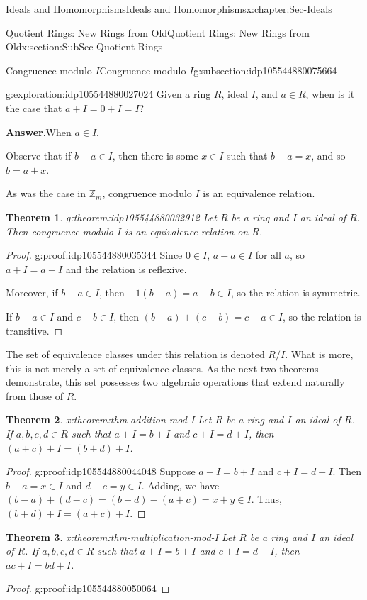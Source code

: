 \documentclass[oneside,10pt,]{book}
\newcommand{\blocktitlefont}{\relax}
\numberwithin{equation}{section}
\def\Z{{\mathbb Z}}
\newtheorem{theorem}{Theorem}[section]
\begin{document}
\begin{chapterptx}{Ideals and Homomorphisms}{}{Ideals and Homomorphisms}{}{}{x:chapter:Sec-Ideals}
\begin{sectionptx}{Quotient Rings: New Rings from Old}{}{Quotient Rings: New Rings from Old}{}{}{x:section:SubSec-Quotient-Rings}
\begin{subsectionptx}{Congruence modulo \(I\)}{}{Congruence modulo \(I\)}{}{}{g:subsection:idp105544880075664}
\begin{exploration}{}{g:exploration:idp105544880027024}%
Given a ring \(R\), ideal \(I\), and \(a\in R\), when is it the case that \(a + I = 0 + I = I\)?%
\par\smallskip%
\noindent\textbf{\blocktitlefont Answer}.\hypertarget{g:answer:idp105544880029328}{}\quad{}When \(a\in I\).%
\end{exploration}%
Observe that if \(b-a \in I\), then there is some \(x\in I\) such that \(b-a = x\), and so \(b = a+x\).%
\par
As was the case in \(\Z_m\), congruence modulo \(I\) is an equivalence relation.%
\begin{theorem}{}{}{g:theorem:idp105544880032912}%
Let \(R\) be a ring and \(I\) an ideal of \(R\). Then congruence modulo \(I\) is an equivalence relation on \(R\).%
\end{theorem}
\begin{proof}{}{g:proof:idp105544880035344}
Since \(0\in I\), \(a-a \in I\) for all \(a\), so \(a + I = a+I\) and the relation is reflexive.%
\par
Moreover, if \(b-a \in I\), then \(-1(b-a) = a-b \in I\), so the relation is symmetric.%
\par
If \(b-a \in I\) and \(c-b\in I\), then \((b-a) + (c-b) = c-a \in I\), so the relation is transitive.%
\end{proof}
The set of equivalence classes under this relation is denoted \(R/I\). What is more, this is not merely a set of equivalence classes. As the next two theorems demonstrate, this set possesses two algebraic operations that extend naturally from those of \(R\).%
\begin{theorem}{}{}{x:theorem:thm-addition-mod-I}%
Let \(R\) be a ring and \(I\) an ideal of \(R\). If \(a,b,c,d\in R\) such that \(a+I = b+I\) and \(c+I = d+I\), then \((a+c) + I = (b+d) + I\).%
\end{theorem}
\begin{proof}{}{g:proof:idp105544880044048}
Suppose \(a+I = b+I\) and \(c+I = d+I\). Then \(b-a =x \in I\) and \(d-c = y \in I\). Adding, we have \((b-a) + (d-c) = (b+d) - (a+c) = x+y \in I\). Thus, \((b+d) + I = (a+c) + I\).%
\end{proof}
\begin{theorem}{}{}{x:theorem:thm-multiplication-mod-I}%
Let \(R\) be a ring and \(I\) an ideal of \(R\). If \(a,b,c,d\in R\) such that \(a+I = b+I\) and \(c+I = d+I\), then \(ac + I = bd + I\).%
\end{theorem}
\begin{proof}{}{g:proof:idp105544880050064}

\end{proof}
\end{subsectionptx}
\end{sectionptx}
\end{chapterptx}
\end{document}
